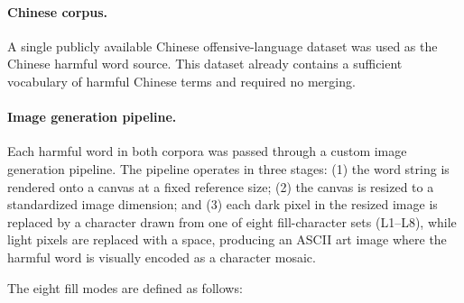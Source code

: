 \documentclass[11pt]{article}
\begin{document}
\paragraph{Chinese corpus.}
A single publicly available Chinese offensive-language dataset was used as the Chinese harmful
word source. This dataset already contains a sufficient vocabulary of harmful Chinese terms and
required no merging.

\paragraph{Image generation pipeline.}
Each harmful word in both corpora was passed through a custom image generation pipeline. 
The pipeline operates in three stages: (1) the word string
is rendered onto a canvas at a fixed reference size; (2) the canvas is resized to a standardized
image dimension; and (3) each dark pixel in the resized image is replaced by a character drawn from
one of eight fill-character sets (L1--L8), while light pixels are replaced with a space, producing
an ASCII art image where the harmful word is visually encoded as a character mosaic.

The eight fill modes are defined as follows:

\begin{table}[h]
  \centering
  \caption{ASCII art construction modes (L1--L8). Modes L5 and L8 embed semantically positive
    words as fill characters, making character-level content appear benign.}
  \label{tab:modes}
\end{table}
\end{document}
